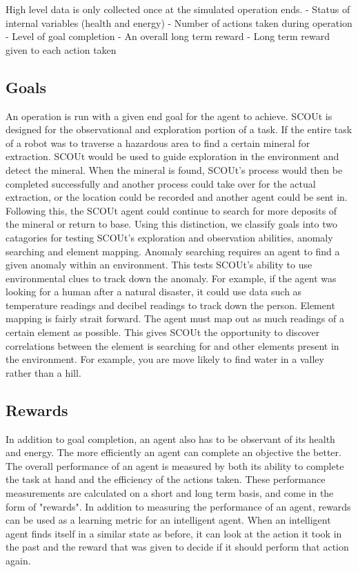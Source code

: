 High level data is only collected once at the simulated operation ends.
- Status of internal variables (health and energy)
- Number of actions taken during operation
- Level of goal completion
- An overall long term reward
- Long term reward given to each action taken


\subsection{Goals}
An operation is run with a given end goal for the agent to achieve.
SCOUt is designed for the observational and exploration portion of a task.
If the entire task of a robot was to traverse a hazardous area to find a certain mineral for extraction.
SCOUt would be used to guide exploration in the environment and detect the mineral.
When the mineral is found, SCOUt's process would then be completed successfully and another process could take over for the actual extraction, or the location could be recorded and another agent could be sent in.
Following this, the SCOUt agent could continue to search for more deposits of the mineral or return to base.
Using this distinction, we classify goals into two catagories for testing SCOUt's exploration and observation abilities, anomaly searching and element mapping.
Anomaly searching requires an agent to find a given anomaly within an environment.
This tests SCOUt's ability to use environmental clues to track down the anomaly.
For example, if the agent was looking for a human after a natural disaster, it could use data such as temperature readings and decibel readings to track down the person.
Element mapping is fairly strait forward.
The agent must map out as much readings of a certain element as possible.
This gives SCOUt the opportunity to discover correlations between the element is searching for and other elements present in the environment.
For example, you are move likely to find water in a valley rather than a hill.


\subsection{Rewards}
In addition to goal completion, an agent also has to be observant of its health and energy.
The more efficiently an agent can complete an objective the better.
The overall performance of an agent is measured by both its ability to complete the task at hand and the efficiency of the actions taken.
These performance measurements are calculated on a short and long term basis, and come in the form of "rewards".
In addition to measuring the performance of an agent, rewards can be used as a learning metric for an intelligent agent.
When an intelligent agent finds itself in a similar state as before, it can look at the action it took in the past and the reward that was given to decide if it should perform that action again.

